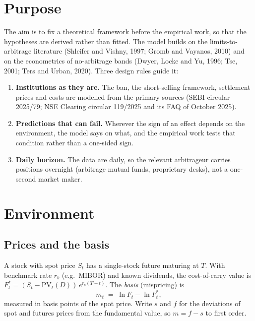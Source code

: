 \documentclass[11pt,a4paper]{article}
\theoremstyle{plain}
\theoremstyle{definition}
\theoremstyle{remark}
\begin{document}
\section{Purpose}
The aim is to fix a theoretical framework before the empirical work, so that the hypotheses are derived rather than
fitted. The model builds on the limits-to-arbitrage literature (Shleifer and Vishny, 1997; Gromb and Vayanos, 2010) and
on the econometrics of no-arbitrage bands (Dwyer, Locke and Yu, 1996; Tse, 2001; Ters and Urban, 2020). Three design
rules guide it:
\begin{enumerate}[leftmargin=1.6em,itemsep=1pt]
\item \textbf{Institutions as they are.} The ban, the short-selling framework, settlement prices and costs are modelled
from the primary sources (SEBI circular 2025/79; NSE Clearing circular 119/2025 and its FAQ of October 2025).
\item \textbf{Predictions that can fail.} Wherever the sign of an effect depends on the environment, the model says on
what, and the empirical work tests that condition rather than a one-sided sign.
\item \textbf{Daily horizon.} The data are daily, so the relevant arbitrageur carries positions overnight
(arbitrage mutual funds, proprietary desks), not a one-second market maker.
\end{enumerate}

\section{Environment}\label{sec:env}
\subsection{Prices and the basis}
A stock with spot price $S_t$ has a single-stock future maturing at $T$. With benchmark rate $r_b$ (e.g.\ MIBOR) and
known dividends, the cost-of-carry value is $F^*_t=(S_t-\mathrm{PV}_t(D))\,e^{r_b(T-t)}$. The \emph{basis} (mispricing)
is
\begin{equation}
m_t \;=\; \ln F_t-\ln F^*_t ,
\end{equation}
measured in basis points of the spot price. Write $s$ and $f$ for the deviations of spot and futures prices from the
fundamental value, so $m=f-s$ to first order.
\end{document}
